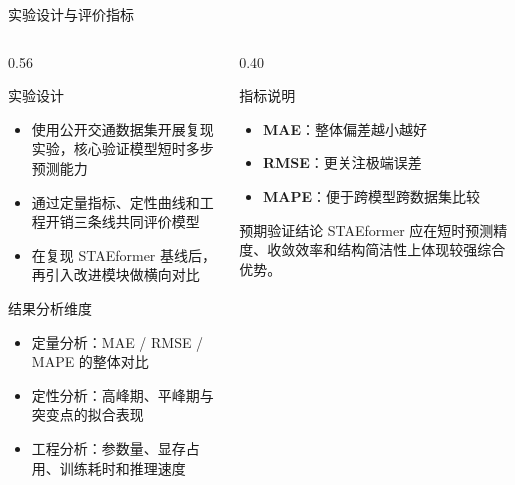 \documentclass[10pt,aspectratio=169]{ctexbeamer}
\begin{document}
\begin{frame}{实验设计与评价指标}
  \begin{columns}[T]
    \begin{column}{0.56\textwidth}
      \begin{block}{实验设计}
        \begin{itemize}\setlength{\itemsep}{2pt}
          \item 使用公开交通数据集开展复现实验，核心验证模型短时多步预测能力
          \item 通过定量指标、定性曲线和工程开销三条线共同评价模型
          \item 在复现 STAEformer 基线后，再引入改进模块做横向对比
        \end{itemize}
      \end{block}

      \begin{exampleblock}{结果分析维度}
        \begin{itemize}\setlength{\itemsep}{2pt}
          \item 定量分析：MAE / RMSE / MAPE 的整体对比
          \item 定性分析：高峰期、平峰期与突变点的拟合表现
          \item 工程分析：参数量、显存占用、训练耗时和推理速度
        \end{itemize}
      \end{exampleblock}
    \end{column}
    \begin{column}{0.40\textwidth}
      \begin{alertblock}{指标说明}
        \begin{itemize}\setlength{\itemsep}{2pt}
          \item \textbf{MAE}：整体偏差越小越好
          \item \textbf{RMSE}：更关注极端误差
          \item \textbf{MAPE}：便于跨模型跨数据集比较
        \end{itemize}
      \end{alertblock}

      \begin{block}{预期验证结论}
        STAEformer 应在短时预测精度、收敛效率和结构简洁性上体现较强综合优势。
      \end{block}
    \end{column}
  \end{columns}
\end{frame}
\end{document}

